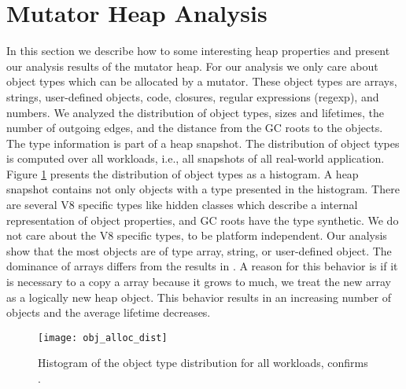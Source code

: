 
\section{Mutator Heap Analysis} \label{sec:analysis_mutator}

In this section we describe how to some interesting heap properties and present our analysis results of the mutator heap. For our analysis we only care about object types which can be allocated by a mutator. These object types are arrays, strings, user-defined objects, code, closures, regular expressions (regexp), and numbers. We analyzed the distribution of object types, sizes and lifetimes, the number of outgoing edges, and the distance from the GC roots to the objects. 
The type information is part of a heap snapshot. The distribution of object types is computed over all workloads, i.e., all snapshots of all real-world application. Figure \ref{fig:obj_alloc_dist} presents the distribution of object types as a histogram. A heap snapshot contains not only objects with a type presented in the histogram. There are several V8 specific types like hidden classes which describe a internal representation of object properties, and GC roots have the type synthetic. We do not care about the V8 specific types, to be platform independent. Our analysis show that the most objects are of type array, string, or user-defined object. The dominance of arrays differs from the results in \cite{JSMeter2009}. A reason for this behavior is if it is necessary to a copy a array because it grows to much, we treat the new array as a logically new heap object. This behavior results in an increasing number of objects and the average lifetime decreases. 
\begin{figure}
	\centering
	\texttt{[image: obj\_alloc\_dist]}
	\caption{Histogram of the object type distribution for all workloads, confirms \cite{JSMeter2009}.}
	\label{fig:obj_alloc_dist}
\end{figure}

